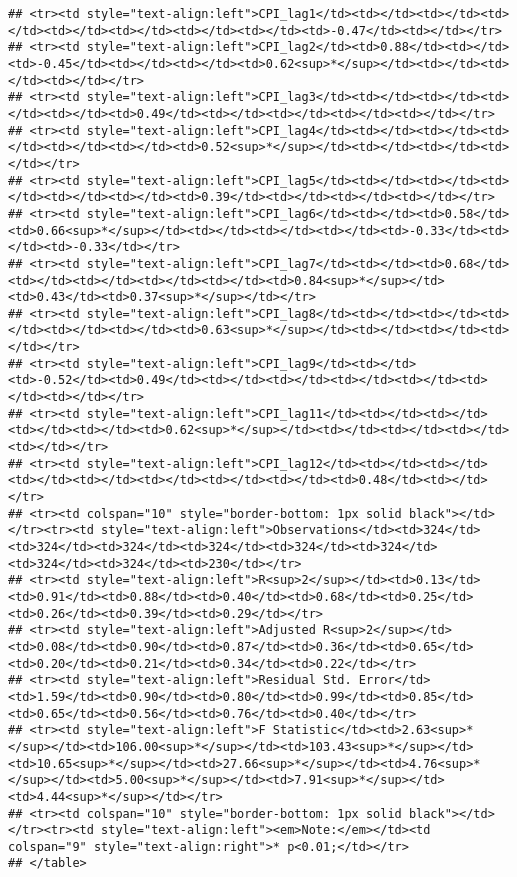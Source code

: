 \documentclass[
]{article}
\begin{document}
\begin{verbatim}
## <tr><td style="text-align:left">CPI_lag1</td><td></td><td></td><td></td><td></td><td></td><td></td><td></td><td>-0.47</td><td></td></tr>
## <tr><td style="text-align:left">CPI_lag2</td><td>0.88</td><td></td><td>-0.45</td><td></td><td></td><td>0.62<sup>*</sup></td><td></td><td></td><td></td></tr>
## <tr><td style="text-align:left">CPI_lag3</td><td></td><td></td><td></td><td></td><td>0.49</td><td></td><td></td><td></td><td></td></tr>
## <tr><td style="text-align:left">CPI_lag4</td><td></td><td></td><td></td><td></td><td></td><td>0.52<sup>*</sup></td><td></td><td></td><td></td></tr>
## <tr><td style="text-align:left">CPI_lag5</td><td></td><td></td><td></td><td></td><td></td><td>0.39</td><td></td><td></td><td></td></tr>
## <tr><td style="text-align:left">CPI_lag6</td><td></td><td>0.58</td><td>0.66<sup>*</sup></td><td></td><td></td><td></td><td>-0.33</td><td></td><td>-0.33</td></tr>
## <tr><td style="text-align:left">CPI_lag7</td><td></td><td>0.68</td><td></td><td></td><td></td><td></td><td>0.84<sup>*</sup></td><td>0.43</td><td>0.37<sup>*</sup></td></tr>
## <tr><td style="text-align:left">CPI_lag8</td><td></td><td></td><td></td><td></td><td></td><td>0.63<sup>*</sup></td><td></td><td></td><td></td></tr>
## <tr><td style="text-align:left">CPI_lag9</td><td></td><td>-0.52</td><td>0.49</td><td></td><td></td><td></td><td></td><td></td><td></td></tr>
## <tr><td style="text-align:left">CPI_lag11</td><td></td><td></td><td></td><td></td><td>0.62<sup>*</sup></td><td></td><td></td><td></td><td></td></tr>
## <tr><td style="text-align:left">CPI_lag12</td><td></td><td></td><td></td><td></td><td></td><td></td><td></td><td>0.48</td><td></td></tr>
## <tr><td colspan="10" style="border-bottom: 1px solid black"></td></tr><tr><td style="text-align:left">Observations</td><td>324</td><td>324</td><td>324</td><td>324</td><td>324</td><td>324</td><td>324</td><td>324</td><td>230</td></tr>
## <tr><td style="text-align:left">R<sup>2</sup></td><td>0.13</td><td>0.91</td><td>0.88</td><td>0.40</td><td>0.68</td><td>0.25</td><td>0.26</td><td>0.39</td><td>0.29</td></tr>
## <tr><td style="text-align:left">Adjusted R<sup>2</sup></td><td>0.08</td><td>0.90</td><td>0.87</td><td>0.36</td><td>0.65</td><td>0.20</td><td>0.21</td><td>0.34</td><td>0.22</td></tr>
## <tr><td style="text-align:left">Residual Std. Error</td><td>1.59</td><td>0.90</td><td>0.80</td><td>0.99</td><td>0.85</td><td>0.65</td><td>0.56</td><td>0.76</td><td>0.40</td></tr>
## <tr><td style="text-align:left">F Statistic</td><td>2.63<sup>*</sup></td><td>106.00<sup>*</sup></td><td>103.43<sup>*</sup></td><td>10.65<sup>*</sup></td><td>27.66<sup>*</sup></td><td>4.76<sup>*</sup></td><td>5.00<sup>*</sup></td><td>7.91<sup>*</sup></td><td>4.44<sup>*</sup></td></tr>
## <tr><td colspan="10" style="border-bottom: 1px solid black"></td></tr><tr><td style="text-align:left"><em>Note:</em></td><td colspan="9" style="text-align:right">* p<0.01;</td></tr>
## </table>
\end{verbatim}
\end{document}
